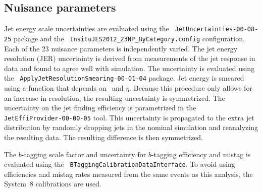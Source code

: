 \subsection{Nuisance parameters}
\label{ss:np}
Jet energy scale uncertainties are evaluated using the \texttt{ JetUncertainties-00-08-25} package and the 
\texttt{ InsituJES2012\_23NP\_ByCategory.config} configuration.
Each of the 23 nuisance parameters is independently varied.
The jet energy resolution (JER) uncertainty is derived from measurements of the jet response in data and found to agree well with simulation. The uncertainty is evaluated using the \texttt{ ApplyJetResolutionSmearing-00-01-04} package.  Jet energy is smeared using
a function that depends on  \pt\ and $\eta$.    Because this procedure only allows for an increase in resolution, 
the resulting uncertainty is symmetrized.
The uncertainty on the jet finding efficiency is parametrized in the  \texttt{ JetEffiProvider-00-00-05} tool.
This uncertainty is propagated to the extra jet distribution by randomly dropping jets in the nominal simulation
and reanalyzing the resulting data.  The resulting difference is then symmetrized. 


The $b$-tagging scale factor and uncertainty for $b$-tagging efficiency and mistag is evaluated using the \texttt{ BTaggingCalibrationDataInterface}. To avoid using efficiencies and mistag rates measured from the same events as this analysis, the System~8 calibrations
are used.


